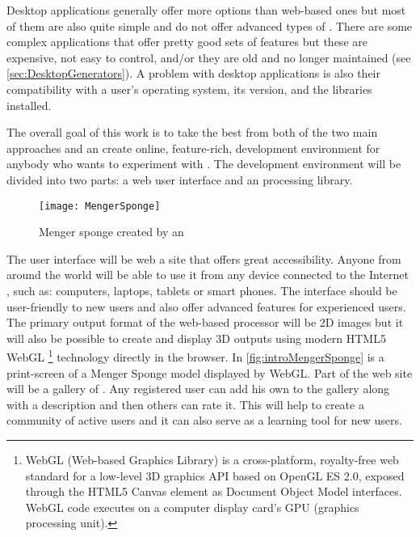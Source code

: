 Desktop applications generally offer more options than web-based ones but most of them are also quite simple and do not offer advanced types of \lsystems.
There are some complex applications that offer pretty good sets of features but these are expensive, not easy to control, and/or they are old and no longer maintained (see \autoref{sec:DesktopGenerators}).
A problem with desktop applications is also their compatibility with a user's operating system, its version, and the libraries installed.

The overall goal of this work is to take the best from both of the two main approaches and an create online, feature-rich, development environment for anybody who wants to experiment with \lsystems.
The development environment will be divided into two parts: a web user interface and an \lsystem processing library.

\begin{wrapfigure}{r}{0.5\textwidth}%
	\vspace{6pt}%
	\texttt{[image: MengerSponge]}
	\caption{Menger sponge created by an \lsystem}
	\label{fig:introMengerSponge}
\end{wrapfigure}

The user interface will be web a site that offers great accessibility.
Anyone from around the world will be able to use it from any device connected to the Internet , such as: computers, laptops, tablets or smart phones.
The interface should be user-friendly to new users and also offer advanced features for experienced users.
The primary output format of the web-based \lsystem processor will be 2D images but it will also be possible to create and display 3D outputs using modern HTML5 WebGL%
	\footnote{WebGL (Web-based Graphics Library) is a cross-platform, royalty-free web standard for a low-level 3D graphics API based on OpenGL ES 2.0, exposed through the HTML5 Canvas element as Document Object Model interfaces.
		WebGL code executes on a computer display card's GPU (graphics processing unit).}
	technology directly in the browser.
In \autoref{fig:introMengerSponge} is a print-screen of a Menger Sponge model displayed by WebGL.
Part of the web site will be a gallery of \lsystems.
Any registered user can add his own \lsystems to the gallery along with a description and then others can rate it.
This will help to create a community of active users and it can also serve as a learning tool for new users.

